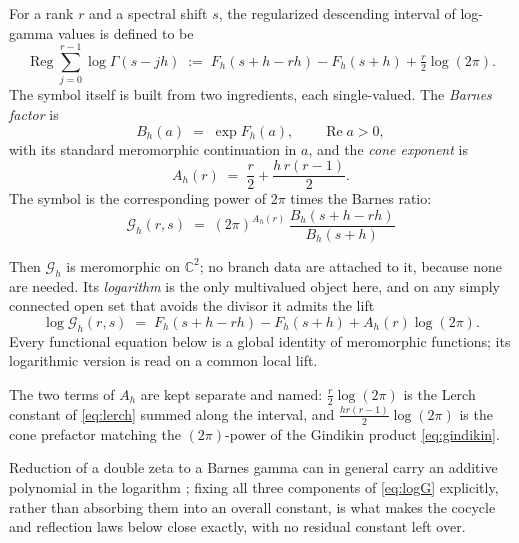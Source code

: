 \documentclass[11pt,letterpaper]{article}
\newcommand{\Gc}{\mathcal{G}}               %
\newcommand{\Fh}{F_h}
\newcommand{\Cc}{\mathbb{C}}
\newcommand{\Reg}{\operatorname{Reg}}
\DeclareMathOperator{\Real}{Re}
\begin{document}
\begin{definition}
\label{def:symbol}
For a rank $r$ and a spectral shift $s$, the regularized descending interval of
log-gamma values is defined to be
\begin{equation}
  \Reg\sum_{j=0}^{r-1}\log\Gamma(s-jh)
  \;:=\;
  \Fh(s+h-rh)-\Fh(s+h)+\tfrac{r}{2}\log(2\pi).
  \label{eq:reginterval}
\end{equation}
The symbol itself is built from two ingredients, each single-valued. The
\emph{Barnes factor} is
\begin{equation}
  B_h(a)\;=\;\exp\Fh(a),
  \qquad \Real a>0,
  \label{eq:barnesfactor}
\end{equation}
with its standard meromorphic continuation in $a$, and the \emph{cone exponent}
is
\begin{equation}
  A_h(r)\;=\;\frac r2+\frac{h\,r(r-1)}{2}.
  \label{eq:coneexponent}
\end{equation}
The symbol is the corresponding power of $2\pi$ times the Barnes ratio:
\begin{equation}
  \boxed{\;
  \Gc_h(r,s)\;=\;(2\pi)^{A_h(r)}\,
  \frac{B_h(s+h-rh)}{B_h(s+h)}\;}
  \label{eq:symbol}
\end{equation}

Then $\Gc_h$ is meromorphic on $\Cc^2$; no branch data are attached to it,
because none are needed. Its \emph{logarithm} is the only multivalued object
here, and on any simply connected open set that avoids the divisor it admits the
lift
\begin{equation}
  \log\Gc_h(r,s)
  \;=\;
  \Fh(s+h-rh)-\Fh(s+h)+A_h(r)\log(2\pi).
  \label{eq:logG}
\end{equation}
Every functional equation below is a global identity of meromorphic functions;
its logarithmic version is read on a common local lift.
\end{definition}

The two terms of $A_h$ are kept separate and named: $\tfrac r2\log(2\pi)$ is the
Lerch constant of \eqref{eq:lerch} summed along the interval, and
$\tfrac{hr(r-1)}{2}\log(2\pi)$ is the cone prefactor matching the $(2\pi)$-power
of the Gindikin product \eqref{eq:gindikin}.

\begin{remark}
Reduction of a double zeta to a Barnes gamma can in general carry an additive
polynomial in the logarithm \cite[Prop.~3.2]{FR}; fixing all three components of
\eqref{eq:logG} explicitly, rather than absorbing them into an overall constant,
is what makes the cocycle and reflection laws below close exactly, with no
residual constant left over.
\end{remark}
\end{document}
